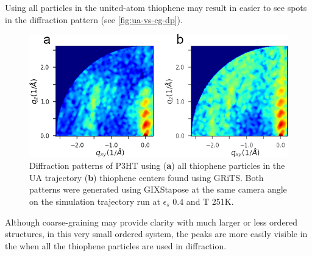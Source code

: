 Using all particles in the united-atom thiophene may result in easier to see spots in the diffraction pattern (see \autoref{fig:ua-vs-cg-dp}).
\begin{figure}
    \centering
    \includegraphics[width=0.8\linewidth]{figures/p3ht_val/ua_vs_cg_dp.png}
    \caption{Diffraction patterns of P3HT using (\textbf{a}) all thiophene particles in the UA trajectory (\textbf{b}) thiophene centers found using GRiTS. Both patterns were generated using GIXStapose at the same camera angle on the simulation trajectory run at $\epsilon_{s}$ 0.4 and T 251K.}\label{fig:ua-vs-cg-dp}
\end{figure}
Although coarse-graining may provide clarity with much larger or less ordered structures, in this very small ordered system, the peaks are more easily visible in the when all the thiophene particles are used in diffraction.

